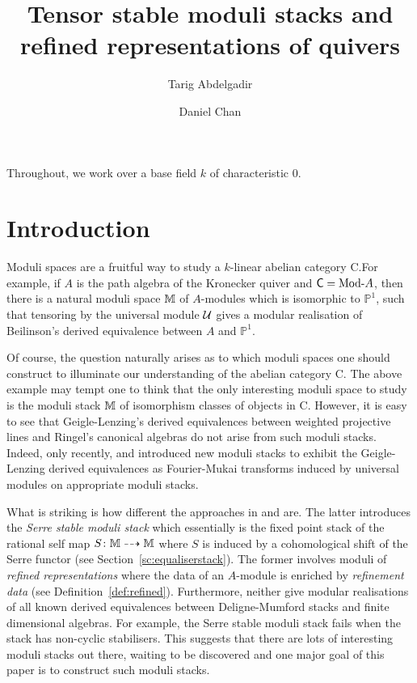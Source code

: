\documentclass[12pt]{amsart}
\title{Tensor stable moduli stacks and refined representations of quivers}
\author{Tarig Abdelgadir}
\author{Daniel Chan}
\begin{document}
\maketitle

Throughout, we work over a base field $k$ of characteristic 0.

\section{Introduction}

Moduli spaces are a fruitful way to study a $k$-linear abelian category {\sf C}.For example, if $A$ is the path algebra of the Kronecker quiver and ${\sf C} = \textup{Mod-}A$, then there is a natural moduli space $\mathbb{M}$ of $A$-modules which is isomorphic to $\mathbb{P}^1$, such that tensoring by the universal module $\mathcal{U}$ gives a modular realisation of Beilinson's derived equivalence between $A$ and $\mathbb{P}^1$. 

Of course, the question naturally arises as to which moduli spaces one should construct to illuminate our understanding of the abelian category {\sf C}. The above example may tempt one to think that the only interesting moduli space to study is the moduli stack $\mathbb{M}$ of isomorphism classes of objects in {\sf C}. However, it is easy to see that Geigle-Lenzing's derived equivalences \cite{GL} between weighted projective lines and Ringel's canonical algebras do not arise from such moduli stacks. Indeed, only recently, \cite{AU} and \cite{CL} introduced new moduli stacks to exhibit the Geigle-Lenzing derived equivalences as Fourier-Mukai transforms induced by universal modules on appropriate moduli stacks. 

What is striking is how different the approaches in \cite{AU} and \cite{CL} are. The latter introduces the {\em Serre stable moduli stack} which essentially is the fixed point stack of the rational self map $S\colon \mathbb{M} \dashrightarrow \mathbb{M}$ where $S$ is induced by a cohomological shift of the Serre functor (see Section~\ref{sc:equaliserstack}). The former involves moduli of {\em refined representations} where the data of an $A$-module is enriched by {\em refinement data} (see Definition~\ref{def:refined}). Furthermore, neither give modular realisations of all known derived equivalences between Deligne-Mumford stacks and finite dimensional algebras. For example, the Serre stable moduli stack fails when the stack has non-cyclic stabilisers. This suggests that there are lots of interesting moduli stacks out there, waiting to be discovered and one major goal of this paper is to construct such moduli stacks. 
\end{document}
